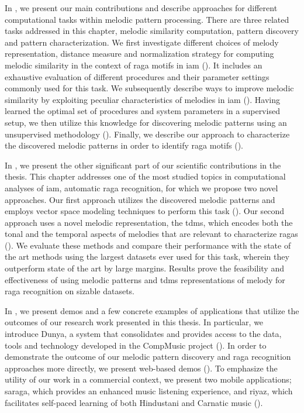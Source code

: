 In , we present our main contributions and describe approaches for different computational tasks within melodic pattern processing. There are three related tasks addressed in this chapter, melodic similarity computation, pattern discovery and pattern characterization. We first investigate different choices of melody representation, distance measure and normalization strategy for computing melodic similarity in the context of \gls{raga} motifs in \gls{iam} (). It includes an exhaustive evaluation of different procedures and their parameter settings commonly used for this task. We subsequently describe ways to improve melodic similarity by exploiting peculiar characteristics of melodies in \gls{iam} (). Having learned the optimal set of procedures and system parameters in a supervised setup, we then utilize this knowledge for discovering melodic patterns using an unsupervised methodology (). Finally, we describe our approach to characterize the discovered melodic patterns in order to identify \gls{raga} motifs (). 

In , we present the other significant part of our scientific contributions in the thesis. This chapter addresses one of the most studied topics in computational analyses of \gls{iam}, automatic \gls{raga} recognition, for which we propose two novel approaches. Our first approach utilizes the discovered melodic patterns and employs vector space modeling techniques to perform this task (). Our second approach uses a novel melodic representation, the \gls{tdms}, which encodes both the tonal and the temporal aspects of melodies that are relevant to characterize \glspl{raga} (). We evaluate these methods and compare their performance with the state of the art methods using the largest datasets ever used for this task, wherein they outperform state of the art by large margins. Results prove the feasibility and effectiveness of using melodic patterns and \gls{tdms} representations of melody for \gls{raga} recognition on sizable datasets.

In , we present demos and a few concrete examples of applications that utilize the outcomes of our research work presented in this thesis. In particular, we introduce Dunya, a system that consolidates and provides access to the data, tools and technology developed in the CompMusic project (). In order to demonstrate the outcome of our melodic pattern discovery and \gls{raga} recognition approaches more directly, we present web-based demos (). To emphasize the utility of our work in a commercial context, we present two mobile applications; \gls{saraga}, which provides an enhanced music listening experience, and \gls{riyaz}, which facilitates self-paced learning of both Hindustani and Carnatic music (). 

